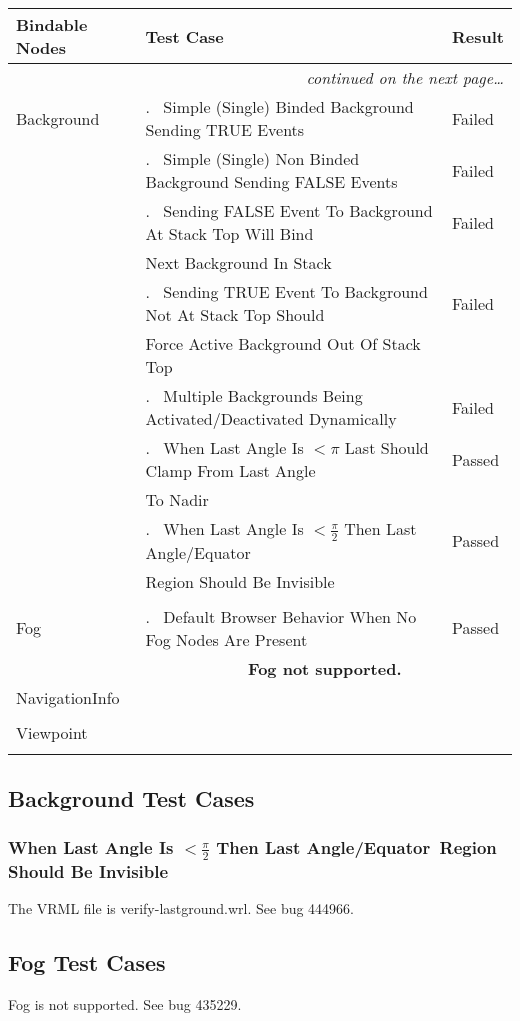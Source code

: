 \documentclass[12pt,letterpaper]{article}
\newcounter{testCaseCtr}
\newcommand{\testCase}{\arabic{testCaseCtr}.~ \stepcounter{testCaseCtr}}
\newcommand{\resetTestCase}{\setcounter{testCaseCtr}{1}}
\newcommand{\BkgA}{Simple (Single) Binded Background Sending TRUE Events}
\newcommand{\BkgB}{Simple (Single) Non Binded Background Sending FALSE Events}
\newcommand{\BkgCa}{Sending FALSE Event To Background At Stack Top Will Bind~}
\newcommand{\BkgCb}{Next Background In Stack}
\newcommand{\BkgDa}{Sending TRUE Event To Background Not At Stack Top Should~}
\newcommand{\BkgDb}{Force Active Background Out Of Stack Top}
\newcommand{\BkgE}{Multiple Backgrounds Being Activated/Deactivated Dynamically}
\newcommand{\BkgFa}{When Last Angle Is $ < \pi$ Last Should Clamp From Last Angle~}
\newcommand{\BkgFb}{To Nadir}
\newcommand{\BkgGa}{When Last Angle Is $ < \frac{\pi}{2}$ Then Last Angle/Equator~}
\newcommand{\BkgGb}{Region Should Be Invisible}
\newcommand{\FogA}{Default Browser Behavior When No Fog Nodes Are Present}
\begin{document}
\begin{center}
\setlongtables
\begin{longtable}{|l|l|l|}
\hline
\textbf{Bindable Nodes} & \textbf{Test Case} & \textbf{Result} \\\hline\hline
\endhead
 & \multicolumn{2}{|r|}{\textsl{continued on the next page\ldots}} \\\hline
\endfoot\hline
\endlastfoot

Background & \testCase \BkgA & Failed \\\cline{2-3}
 & \testCase \BkgB & Failed \\\cline{2-3}
 & \testCase \BkgCa & Failed \\
 & \BkgCb & \\\cline{2-3}
 & \testCase \BkgDa & Failed \\
 & \BkgDb & \\\cline{2-3}
 & \testCase \BkgE & Failed \\\cline{2-3}
 & \testCase \BkgFa & Passed \\
 & \BkgFb & \\\cline{2-3}
 & \testCase \BkgGa & Passed \\
 & \BkgGb & \\\cline{2-3}
 & & \\\hline
\resetTestCase
Fog & \testCase \FogA & Passed \\\cline{2-3}
 & \multicolumn{2}{|c|}{\textbf{Fog not supported.}} \\\hline
\resetTestCase
NavigationInfo & & \\\cline{2-3}
 & & \\\hline
\resetTestCase
Viewpoint & & \\\cline{2-3}
 & & \\
\end{longtable}
\end{center}

\subsection{Background Test Cases}

\setcounter{subsubsection}{6}
\subsubsection{\BkgGa\BkgGb}
The VRML file is verify-lastground.wrl.
See bug 444966.

\subsection{Fog Test Cases}
Fog is not supported.
See bug 435229.
\end{document}

